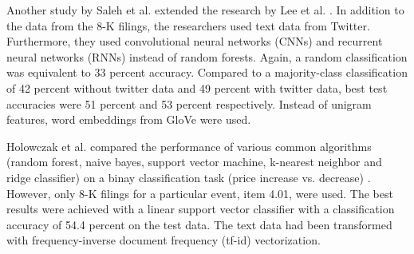 \documentclass{article}
\begin{document}
	Another study by Saleh et al. extended the research by Lee et al. \cite{saleh_neural_nodate}. In addition to the data from the 8-K filings, the researchers used text data from Twitter. Furthermore, they used convolutional neural networks (CNNs) and recurrent neural networks (RNNs) instead of random forests. Again,  a random classification was equivalent to 33 percent accuracy. Compared to a majority-class classification of 42 percent without twitter data and 49 percent with twitter data, best test accuracies were 51 percent and 53 percent respectively. Instead of unigram features, word embeddings from GloVe were used.
	
	Holowczak et al. compared the performance of various common algorithms (random forest, naive bayes, support vector machine, k-nearest neighbor and ridge classifier) on a binay classification task (price increase vs. decrease) \cite{holowczak_testing_2019}. However, only 8-K filings for a particular event, item 4.01, were used. The best results were achieved with a linear support vector classifier with a classification accuracy of 54.4 percent on the test data. The text data had been transformed with frequency-inverse document frequency (tf-id) vectorization.
	
	


	
	
	
	
	
	
\end{document}
